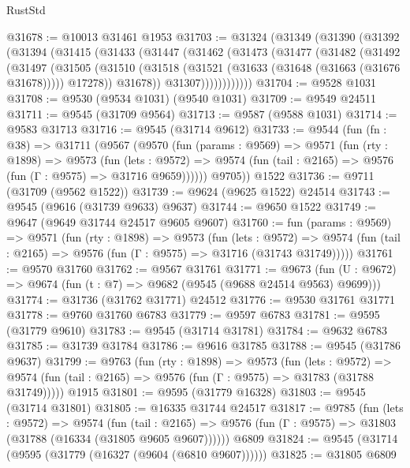 \begin{lexlean}{RustStd}
\begin{coremodule}
@31678 := @10013 @31461 @1953
@31703 := @31324
    (@31349
      (@31390
        (@31392
          (@31394
            (@31415
              (@31433
                (@31447
                  (@31462
                    (@31473
                      (@31477
                        (@31482
                          (@31492
                            (@31497
                              (@31505
                                (@31510
                                  (@31518
                                    (@31521 (@31633 (@31648 (@31663 (@31676 @31678)))))
                                    @17278))
                                @31678))
                            @31307))))))))))))
@31704 := @9528 @1031
@31708 := @9530 (@9534 @1031) (@9540 @1031)
@31709 := @9549 @24511
@31711 := @9545 (@31709 @9564)
@31713 := @9587 (@9588 @1031)
@31714 := @9583 @31713
@31716 := @9545 (@31714 @9612)
@31733 := @9544
    (fun (fn : @38) =>
    @31711
      (@9567
        (@9570
          (fun (params : @9569) =>
          @9571
            (fun (rty : @1898) =>
            @9573
              (fun (lets : @9572) =>
              @9574 (fun (tail : @2165) => @9576 (fun (Γ : @9575) => @31716 @9659))))))
        @9705))
    @1522
@31736 := @9711 (@31709 (@9562 @1522))
@31739 := @9624 (@9625 @1522) @24514
@31743 := @9545 (@9616 (@31739 @9633) @9637)
@31744 := @9650 @1522
@31749 := @9647 (@9649 @31744 @24517 @9605 @9607)
@31760 := fun (params : @9569) =>
  @9571
    (fun (rty : @1898) =>
    @9573
      (fun (lets : @9572) =>
      @9574 (fun (tail : @2165) => @9576 (fun (Γ : @9575) => @31716 (@31743 @31749)))))
@31761 := @9570 @31760
@31762 := @9567 @31761
@31771 := @9673
    (fun (U : @9672) => @9674 (fun (t : @7) => @9682 (@9545 (@9688 @24514 @9563) @9699)))
@31774 := @31736 (@31762 @31771) @24512
@31776 := @9530 @31761 @31771
@31778 := @9760 @31760 @6783
@31779 := @9597 @6783
@31781 := @9595 (@31779 @9610)
@31783 := @9545 (@31714 @31781)
@31784 := @9632 @6783
@31785 := @31739 @31784
@31786 := @9616 @31785
@31788 := @9545 (@31786 @9637)
@31799 := @9763
    (fun (rty : @1898) =>
    @9573
      (fun (lets : @9572) =>
      @9574 (fun (tail : @2165) => @9576 (fun (Γ : @9575) => @31783 (@31788 @31749)))))
    @1915
@31801 := @9595 (@31779 @16328)
@31803 := @9545 (@31714 @31801)
@31805 := @16335 @31744 @24517
@31817 := @9785
    (fun (lets : @9572) =>
    @9574
      (fun (tail : @2165) =>
      @9576 (fun (Γ : @9575) => @31803 (@31788 (@16334 (@31805 @9605 @9607))))))
    @6809
@31824 := @9545 (@31714 (@9595 (@31779 (@16327 (@9604 (@6810 @9607))))))
@31825 := @31805 @6809

\end{coremodule}
\end{lexlean}
